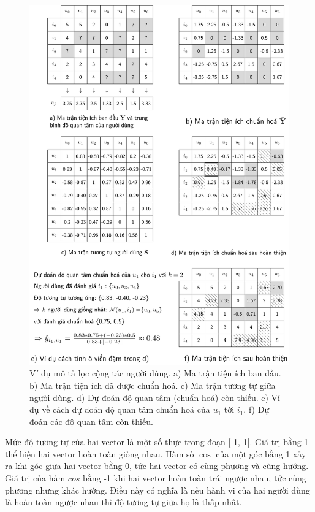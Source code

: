  \begin{figure}[t]
\centering
    \includegraphics[width = .85\textwidth]{Chapters/06_RecommendationSystems/24_collaborativefiltering/latex/user_cf_gray_v.pdf}
    \caption[]{Ví dụ mô tả lọc cộng tác người dùng. a) Ma trận tiện ích ban đầu. b) Ma trận tiện ích đã được chuẩn hoá. c) Ma trận tương tự giữa người dùng. d) Dự đoán độ quan tâm (chuẩn hoá) còn thiếu. e) Ví dụ về cách dự đoán độ quan tâm chuẩn hoá của $u_1$ tới $i_1$. f) Dự đoán các độ quan tâm còn thiếu.}
    \label{fig:24_2}
\end{figure}

Mức độ tương tự của hai vector là một số thực trong đoạn [-1, 1]. Giá
trị bằng 1 thể hiện hai vector hoàn toàn giống nhau. Hàm số
${\cos}$ của một góc bằng 1 xảy ra khi góc giữa hai vector bằng 0, tức hai
vector có cùng phương và cùng hướng. Giá trị của hàm ${cos}$ bằng -1 khi hai 
vector hoàn toàn trái ngược nhau, tức cùng phương nhưng khác hướng. Điều này có
nghĩa là nếu {hành vi} của hai người dùng là hoàn toàn
ngược nhau thì độ tương tự giữa họ là thấp nhất.
 
